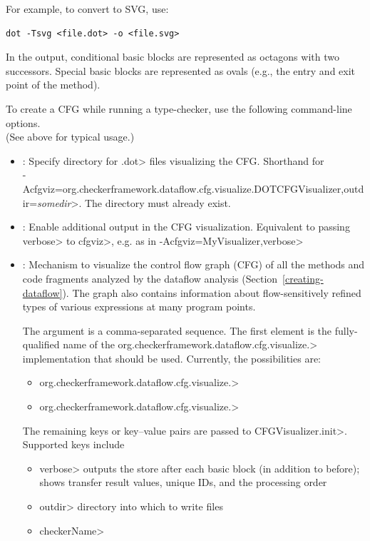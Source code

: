 \noindent
For example, to convert to SVG, use:

\begin{Verbatim}
dot -Tsvg <file.dot> -o <file.svg>
\end{Verbatim}


In the output, conditional basic blocks are represented as octagons with
two successors.  Special basic blocks are represented as ovals (e.g., the
entry and exit point of the method).



To create a CFG while running a type-checker, use the following
command-line options. \\
(See above for typical usage.)

\begin{itemize}

\item {}:
  Specify directory for \<.dot> files visualizing the CFG\@.
  Shorthand for\\
  \<-Acfgviz=org.checkerframework.dataflow.cfg.visualize.DOTCFGVisualizer,outdir=\emph{somedir}>.
  The directory must already exist.

\item {}:
  Enable additional output in the CFG visualization.
  Equivalent to passing \<verbose> to \<cfgviz>, e.g. as in
  \<-Acfgviz=MyVisualizer,verbose>

\item {}:
  Mechanism to visualize the control flow graph (CFG) of
  all the methods and code fragments
  analyzed by the dataflow analysis (Section~\ref{creating-dataflow}).
  The graph also contains information about flow-sensitively refined
  types of various expressions at many program points.

  The argument is a comma-separated sequence.
  The first element is the fully-qualified name of the
  \<org.checkerframework.dataflow.cfg.visualize.> implementation
  that should be used. Currently, the possibilities are:
  \begin{itemize}
  \item \<org.checkerframework.dataflow.cfg.visualize.>
  \item \<org.checkerframework.dataflow.cfg.visualize.>
  \end{itemize}
  The remaining keys or key--value pairs are
  passed to \<CFGVisualizer.init>.  Supported keys include
  \begin{itemize}
  \item \<verbose>
    outputs the store after each basic block (in addition to before);
    shows transfer result values, unique IDs, and the processing order
  \item \<outdir> directory into which to write files
  \item \<checkerName>
  \end{itemize}


\end{itemize}
